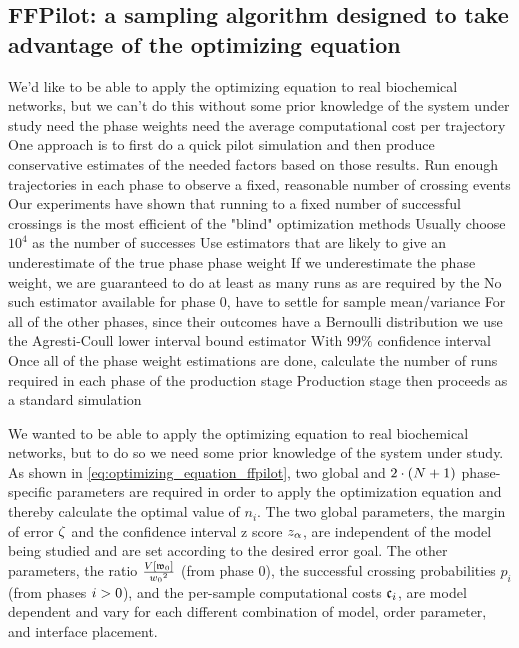 \subsection{FFPilot: a sampling algorithm designed to take advantage of the optimizing equation}
\label{sec:ffpilot_definition}
\begin{odone}
    \1 We'd like to be able to apply the optimizing equation to real biochemical networks, but we can't do this without some prior knowledge of the system under study
        \2 need the phase weights
        \2 need the average computational cost per trajectory
    \1 One approach is to first do a quick pilot simulation and then produce conservative estimates of the needed factors based on those results.
        \2 Run enough trajectories in each phase to observe a fixed, reasonable number of crossing events
            \3 Our experiments have shown that running to a fixed number of successful crossings is the most efficient of the "blind" optimization methods
            \3 Usually choose $10^4$ as the number of successes
        \2 Use estimators that are likely to give an underestimate of the true phase phase weight
            \3 If we underestimate the phase weight, we are guaranteed to do at least as many runs as are required by the \opteq{}
            \3 No such estimator available for phase 0, have to settle for sample mean/variance
            \3 For all of the other phases, since their outcomes have a Bernoulli distribution we use the Agresti-Coull lower interval bound estimator
                \4 With $99\%$ confidence interval
    \1 Once all of the phase weight estimations are done, calculate the number of runs required in each phase of the production stage
        \2 Production stage then proceeds as a standard  simulation
\end{odone}
We wanted to be able to apply the optimizing equation to real biochemical networks, but to do so we need some prior knowledge of the system under study. As shown in \eqref{eq:optimizing_equation_ffpilot}, two global and $2 \cdot (N + 1)$ phase-specific parameters are required in order to apply the optimization equation and thereby calculate the optimal value of $n_i$. The two global parameters, the margin of error $\zeta$ and the confidence interval z score $z_{\alpha}$, are independent of the model being studied and are set according to the desired error goal. The other parameters, the ratio $\frac{V \left[ \mathfrak{w}_{0} \right]}{w_{0} {}^2}$ (from phase 0), the successful crossing probabilities $p_i$ (from phases $i>0$), and the per-sample computational costs $\mathfrak{c}_{i}$, are model dependent and vary for each different combination of model, order parameter, and interface placement.

